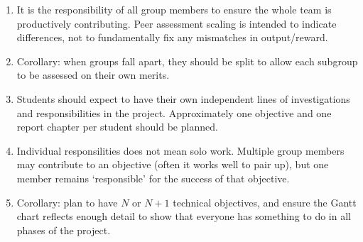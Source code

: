 \documentclass[11pt,a5paper]{article}
\begin{document}
\begin{enumerate}[resume]
\item It is the responsibility of all group members to ensure the whole team is productively contributing. Peer assessment scaling is intended to indicate differences, not to fundamentally fix any mismatches in output/reward.
\item Corollary: when groups fall apart, they should be split to allow each subgroup to be assessed on their own merits.
\item Students should expect to have their own independent lines of investigations and responsibilities in the project. Approximately one objective and one report chapter per student should be planned.
\item Individual responsilities does not mean solo work. Multiple group members may contribute to an objective (often it works well to pair up), but one member remains `responsible' for the success of that objective.
\item Corollary: plan to have $N$ or $N+1$ technical objectives, and ensure the Gantt chart reflects enough detail to show that everyone has something to do in all phases of the project.
\end{enumerate}
\end{document}
